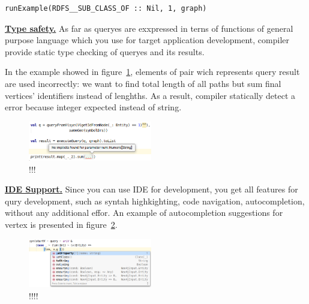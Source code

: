 \begin{lstlisting}
runExample(RDFS__SUB_CLASS_OF :: Nil, 1, graph)
\end{lstlisting}



\underline{\textbf{Type safety.}}
As far as queryes are exxpressed in terns of functions of general purpose language which you use for target application development, compiler provide static type checking of queryes and its results. 

In the example showed in figure~\ref{fig:types}, elements of pair wich represents query result are used incorrectly: we want to find total length of all paths but sum final vertices' identifiers instead of lenghths.
As a result, compiler statically detect a error because integer expected instead of string.

\begin{figure}[ht]
   \includegraphics[width=0.48\textwidth]{pictures/image.png}
   \caption{!!!}
   \label{fig:types}
\end{figure}

\underline{\textbf{IDE Support.}}
Since you can use IDE for development, you get all features for qury development, such as syntah highkighting, code navigation, autocompletion, without any additional effor.
An example of autocompletion suggestions for vertex is presented in figure~\ref{fig:autocompletion}.

\begin{figure}[ht]
    \centering
    \includegraphics[width=0.48\textwidth]{pictures/image1.png}
    \caption{!!!!}
    \label{fig:autocompletion}
\end{figure}
